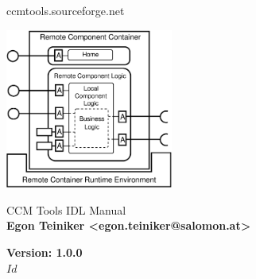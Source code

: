 \begin{titlepage}

\centering

\vspace*{20mm}
{\huge ccmtools.sourceforge.net }
\vspace{20 mm}

\centerline{\includegraphics[width=55mm]{figures/LocalAdapterConcept.eps}}

\vspace{30mm}

{\Huge CCM Tools IDL Manual}\\ 
\vspace{5mm}
{\bf Egon Teiniker <egon.teiniker@salomon.at>}\\
\vspace{30mm}


{\Large \bf Version: 1.0.0} \\
\vspace{5mm}
$Id$
\end{titlepage}